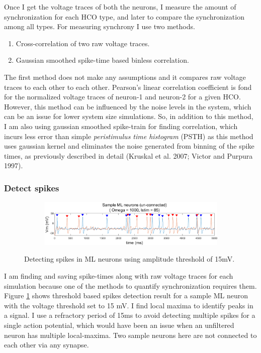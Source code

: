 \documentclass[
]{article}
\providecommand{\tightlist}{%
  \setlength{\itemsep}{0pt}\setlength{\parskip}{0pt}}
\begin{document}
Once I get the voltage traces of both the neurons, I measure the amount of synchronization for each HCO type, and later to compare the synchronization among all types. For measuring synchrony I use two methods.

\begin{enumerate}
\def\labelenumi{\arabic{enumi}.}
\tightlist
\item
  Cross-correlation of two raw voltage traces.
\item
  Gaussian smoothed spike-time based binless correlation.
\end{enumerate}

The first method does not make any assumptions and it compares raw voltage traces to each other to each other. Pearson's linear correlation coefficient is fond for the normalized voltage traces of neuron-1 and neuron-2 for a given HCO. However, this method can be influenced by the noise levels in the system, which can be an issue for lower system size simulations. So, in addition to this method, I am also using gaussian smoothed spike-train for finding correlation, which incurs less error than simple \emph{peristimulus time histogram} (PSTH) as this method uses gaussian kernel and eliminates the noise generated from binning of the spike times, as previously described in detail (Kruskal et al. 2007; Victor and Purpura 1997).

\hypertarget{spk}{%
\subsubsection{Detect spikes}\label{spk}}

\begin{figure}
  \centering
  \begin{subfigure}[b]{\textwidth}
    \centering
    \includegraphics[width=\textwidth]{figs/F4_sample_ML.png}
  \end{subfigure}
  \vspace{-0.5cm}
  \caption{Detecting spikes in ML neurons using amplitude threshold of 15mV.}  \label{fig:fig4}
\end{figure}

I am finding and saving spike-times along with raw voltage traces for each simulation because one of the methods to quantify synchronization requires them. Figure \ref{fig:fig4} shows threshold based spikes detection result for a sample ML neuron with the voltage threshold set to 15 mV. I find local maxima to identify peaks in a signal. I use a refractory period of 15ms to avoid detecting multiple spikes for a single action potential, which would have been an issue when an unfiltered neuron has multiple local-maxima. Two sample neurons here are not connected to each other via any synapse.
\end{document}
